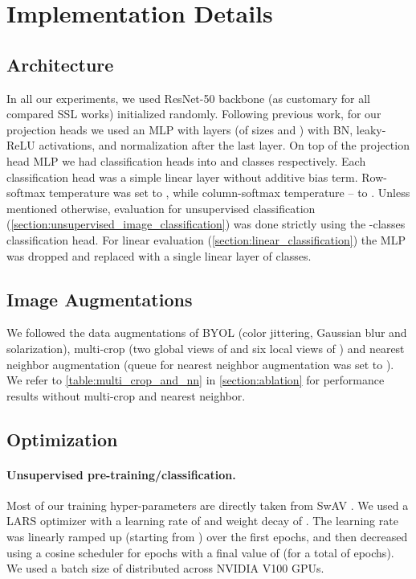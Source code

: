 \documentclass[runningheads]{llncs}
\begin{document}
\section{Implementation Details}
\subsection{Architecture}
\label{section:implementation_details_arch}
In all our experiments, we used ResNet-50 \cite{he2016deep} backbone (as customary for all compared SSL works) initialized randomly. Following previous work, for our projection heads we used an MLP with  layers (of sizes  and ) with BN, leaky-ReLU activations, and  normalization after the last layer.
On top of the projection head MLP we had  classification heads into  and  classes respectively. Each classification head was a simple linear layer without additive bias term. Row-softmax temperature  was set to , while column-softmax temperature  -- to . Unless mentioned otherwise, evaluation for unsupervised classification (\cref{section:unsupervised_image_classification}) was done strictly using the -classes classification head. For linear evaluation (\cref{section:linear_classification}) the MLP was dropped and replaced with a single linear layer of  classes.  

\subsection{Image Augmentations}
We followed the data augmentations of BYOL \cite{grill2020bootstrap} (color jittering, Gaussian blur and solarization), multi-crop \cite{caron2020unsupervised} (two global views of  and six local views of ) and nearest neighbor augmentation \cite{Dwibedi_2021_ICCV} (queue for nearest neighbor augmentation was set to ). We refer to \cref{table:multi_crop_and_nn} in \cref{section:ablation} for performance results without multi-crop and nearest neighbor. 

\subsection{Optimization}
\label{section:optimization}
\paragraph{Unsupervised pre-training/classification.} Most of our training hyper-parameters are directly taken from SwAV \cite{caron2020unsupervised}. We used a LARS optimizer \cite{you2017large} with a learning rate of  and weight decay of . The learning rate was linearly ramped up (starting from ) over the first  epochs, and then decreased using a cosine scheduler for  epochs with a final value of  (for a total of  epochs). We used a batch size of  distributed across  NVIDIA V100 GPUs.
\end{document}

